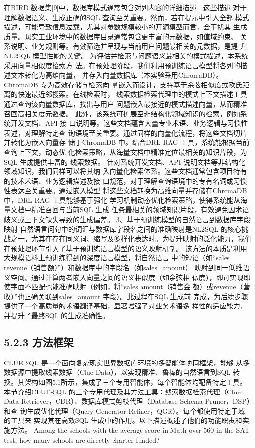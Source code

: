 \documentclass[12pt,a4paper,openright,UTF8]{ctexbook}
\begin{document}
在BIRD 数据集[9]中，数据库模式通常包含对列内容的详细描述，这些描述 对于理解数据语义、生成正确的SQL 查询至关重要。然而，若在提示中引入全部 模式描述，可能导致信息过载，尤其对参数规模较小的开源模型而言，会干扰其 生成质量。现实工业环境中的数据库目录通常包含更丰富的元数据，如值域约束、 关系说明、业务规则等。有效筛选并呈现与当前用户问题最相关的元数据，是提 升NL2SQL 模型性能的关键。 为评估并检索与问题语义最相关的模式描述，本系统采用向量相似度检索方 法。在预处理阶段，我们利用预训练语言模型将各列的描述文本转化为高维向量， 并存入向量数据库（本实验采用ChromaDB）。ChromaDB 专为高效存储与检索向 量嵌入而设计，支持基于余弦相似度或欧氏距离的快速最近邻搜索。在线检索时， 线索数据检索代理中的模式上下文描述工具通过查询该向量数据库，找出与用户 问题嵌入最接近的模式描述向量，从而精准召回高相关度元数据。 此外，该系统可扩展至非结构化领域知识的检索，例如系统开发文档、API 接 口说明等。这些文档蕴含大量专业术语、业务逻辑与习惯性表述，对理解特定查 询语境至关重要。通过同样的向量化流程，将这些文档切片并转化为嵌入向量存 储于ChromaDB 中。结合DRL-RAG 工具，系统能根据当前查询上下文，动态优 化检索策略，从海量文档中精准定位最相关的知识片段，为SQL 生成提供丰富的 线索数据。 针对系统开发文档、API 说明文档等非结构化领域知识，我们同样可以将其纳 入向量化检索体系。这些文档通常包含项目特有的技术术语、业务逻辑描述及接 口规范，对于理解查询语境中的专有名词或习惯性表达至关重要。通过嵌入模型 将这些文档转换为高维向量并存储在ChromaDB 中，DRL-RAG 工具能够基于强化 学习机制动态优化检索策略，使得系统能从海量文档中精准召回与当前SQL 生成 任务最相关的领域知识片段，有效避免因术语歧义或上下文缺失导致的生成偏差。 3、基于预训练模型的自然语言到数据库字段映射 自然语言问句中的词汇与数据库字段名之间的准确映射是NL2SQL 的核心挑 战之一，尤其在存在同义词、缩写及多样化表达时。为提升映射的泛化能力，我们 在预处理环节引入了基于预训练语言模型的语义映射机制。 该方法的本质是利用大规模语料上预训练得到的深度语言模型，将自然语言 中的短语（如“sales revenue（销售额）”）和数据库中的字段名（如sales\_amount） 映射到同一低维语义空间。通过计算两者嵌入向量之间的语义相似度（如余弦相 似度），即可实现即使字面不匹配也能准确映射（例如，将“sales amount（销售金 额）或revenue（营收）”也正确关联到sales\_amount 字段）。此过程在SQL 生成前 完成，为后续步骤提供了一个高质量的术语翻译基础，显著增强了对业务术语多 样性的适应能力，并提升了最终SQL 的生成准确性。

\subsection{5.2.3 方法框架}

CLUE-SQL 是一个面向复杂现实世界数据库环境的多智能体协同框架，能够 从多数据源中提取线索数据（Clue Data），以实现精准、鲁棒的自然语言到SQL 转 换。其架构如图5.1所示，集成了三个专用智能体，每个智能体均配备特定工具。 本节介绍CLUE-SQL 的三个专用代理及其方法工具：线索数据检索代理（Clue Data Retriever，CDR）、数据库模式剪枝代理（Database Schema Pruner，DSP）和查 询生成优化代理（Query Generator-Refiner，QGR）。每个都使用特定于域的工具来 实现其在高效SQL 生成中的作用。以下描述概述了他们的功能职责和实施方法。 Among the schools with the average score in Math over 560 in the SAT test, how many schools are directly charter-funded?
\end{document}
